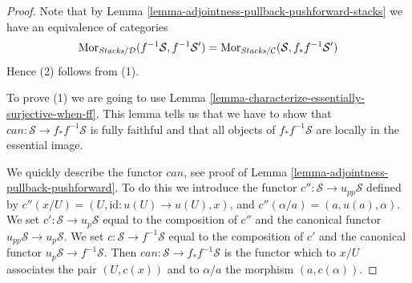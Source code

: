 \begin{proof}
Note that by
Lemma \ref{lemma-adjointness-pullback-pushforward-stacks}
we have an equivalence of categories
$$
\mathop{\mathrm{Mor}}\nolimits_{\textit{Stacks}/\mathcal{D}}(f^{-1}\mathcal{S}, f^{-1}\mathcal{S}')
=
\mathop{\mathrm{Mor}}\nolimits_{\textit{Stacks}/\mathcal{C}}(\mathcal{S}, f_*f^{-1}\mathcal{S}')
$$
Hence (2) follows from (1).

\medskip\noindent
To prove (1) we are going to use
Lemma \ref{lemma-characterize-essentially-surjective-when-ff}.
This lemma tells us that we have to show that
$can : \mathcal{S} \to f_*f^{-1}\mathcal{S}$ is
fully faithful and that all objects of $f_*f^{-1}\mathcal{S}$
are locally in the essential image.

\medskip\noindent
We quickly describe the functor $can$, see proof of
Lemma \ref{lemma-adjointness-pullback-pushforward}.
To do this we introduce the functor
$c'' : \mathcal{S} \to u_{pp}\mathcal{S}$ defined by
$c''(x/U) = (U, \text{id} : u(U) \to u(U), x)$, and
$c''(\alpha/a) = (a, u(a), \alpha)$. We set
$c' : \mathcal{S} \to u_p\mathcal{S}$ equal to the composition
of $c''$ and the canonical functor $u_{pp}\mathcal{S} \to u_p\mathcal{S}$.
We set $c : \mathcal{S} \to f^{-1}\mathcal{S}$ equal to the composition
of $c'$ and the canonical functor $u_p\mathcal{S} \to f^{-1}\mathcal{S}$.
Then $can : \mathcal{S} \to f_*f^{-1}\mathcal{S}$ is the functor
which to $x/U$ associates the pair $(U, c(x))$ and to
$\alpha/a$ the morphism $(a, c(\alpha))$.


\end{proof}
